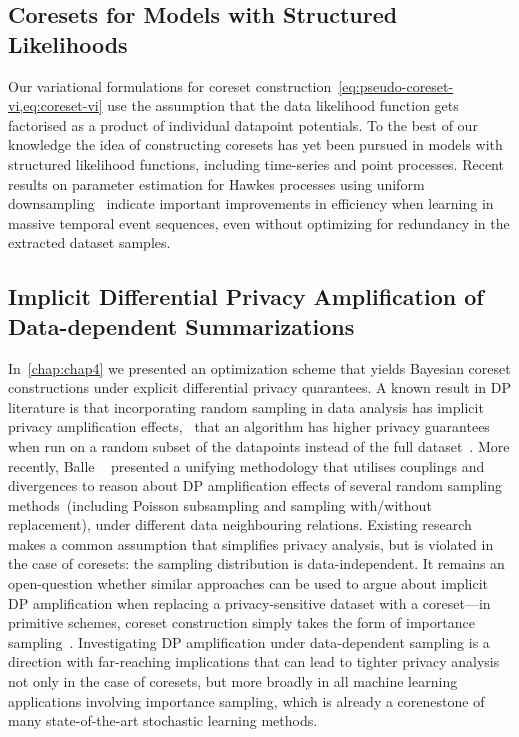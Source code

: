 \subsection{Coresets for Models with Structured Likelihoods}
\label{subsec:structure-liks}

Our variational formulations for coreset construction~\cref{eq:pseudo-coreset-vi,eq:coreset-vi} use the assumption that the data likelihood function gets factorised as a product of individual datapoint potentials. To the best of our knowledge the idea of constructing coresets has yet been pursued in models with structured likelihood functions, including time-series and point processes. Recent results on parameter estimation for Hawkes processes using uniform downsampling~\citep{li19} indicate important improvements in efficiency when learning in massive temporal event sequences, even without optimizing for redundancy in the extracted dataset samples.

\subsection{Implicit Differential Privacy Amplification of Data-dependent Summarizations}
\label{subsec:implicit-dp-amplification}

In~\cref{chap:chap4} we presented an optimization scheme that yields Bayesian coreset constructions under explicit differential privacy quarantees. A known result in DP literature is that incorporating random sampling in data analysis has implicit privacy amplification effects, \ie~that an algorithm has higher privacy guarantees when run on a random subset of the datapoints instead of the full dataset~\citep{li12, beimel13, bassily14, abadi16}. More recently, Balle \etal~\citep{balle18} presented a unifying methodology that utilises couplings and divergences to reason about DP amplification effects of several random sampling methods~(including Poisson subsampling and sampling with/without replacement), under different data neighbouring relations. Existing research makes a common assumption that simplifies privacy analysis, but is violated in the case of coresets: the sampling distribution is data-independent. It remains an open-question whether similar approaches can be used to argue about implicit DP amplification when replacing a privacy-sensitive dataset with a coreset---in primitive schemes, coreset construction simply takes the form of importance sampling~\citep{bachem17}. Investigating DP amplification under data-dependent sampling is a direction with far-reaching implications that can lead to tighter privacy analysis not only in the case of coresets, but more broadly in all machine learning applications involving importance sampling, which is already a corenestone of many state-of-the-art stochastic learning methods. 


